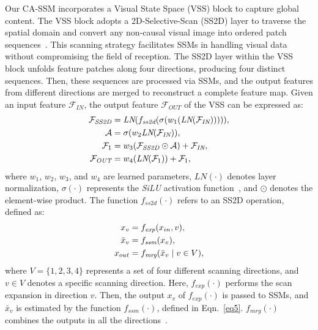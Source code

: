 Our CA-SSM incorporates a Visual State Space (VSS) block to capture global content.
The VSS block adopts a 2D-Selective-Scan (SS2D) layer to traverse the spatial domain and convert any non-causal visual image into ordered patch sequences~\cite{liu2024vmamba}.
This scanning strategy facilitates SSMs in handling visual data without compromising the field of reception.
The SS2D layer within the VSS block unfolds feature patches along four directions, producing four distinct sequences. 
Then, these sequences are processed via SSMs, and the output features from different directions are merged to reconstruct a complete feature map.
Given an input feature $\mathcal{F}_\textit{IN}$, the output feature $\mathcal{F}_\textit{OUT}$ of the VSS can be expressed as:
\vspace{-0.5em}
\begin{equation}
\vspace{-0.5em}
\begin{aligned}
\mathcal{F}_\textit{SS2D} &= \textit{LN}(f_\textit{ss2d}(\sigma (w_1(\textit{LN}(\mathcal{F}_\textit{IN}))))), \\
\mathcal{A} &= \sigma (w_2 \textit{LN}(\mathcal{F}_\textit{IN})), \\
\mathcal{F}_{1} &= w_3( \mathcal{F}_\textit{SS2D} \odot \mathcal{A}) + \mathcal{F}_\textit{IN}, \\
\mathcal{F}_\textit{OUT} &= w_4( \textit{LN} (\mathcal{F}_{1}) ) + \mathcal{F}_{1},
\end{aligned}
\label{eq6}
\end{equation}
where $w_1$, $w_2$, $w_3$, and $w_4$ are learned parameters, 
$\textit{LN}(\cdot)$ denotes layer normalization,
$\sigma(\cdot)$ represents the \textit{SiLU} activation function~\cite{ramachandran2017searching}, 
and $\odot$ denotes the element-wise product. 
The function $f_\textit{ss2d}(\cdot)$ refers to an SS2D operation, defined as:
\vspace{-0.5em}
\begin{equation}
\vspace{-0.5em}
\begin{aligned}
x_{v} &= f_\textit{exp}(x_{in}, v), \\
\bar{x}_v &= f_\textit{ssm}(x_{v}), \\
x_{out} &= f_\textit{mrg}(\bar{x}_v \mid v \in V),
\end{aligned}
\label{eq7}
\end{equation}
where $V=\{1, 2, 3, 4\}$ represents a set of four different scanning directions, and $v \in V$ denotes a specific scanning direction.
Here, $f_\textit{exp}(\cdot)$ performs the scan expansion in direction $v$. Then, the output $x_v$ of $f_\textit{exp}(\cdot)$ is passed to SSMs, and $\bar{x}_v$ is estimated by the function $f_\textit{ssm}(\cdot)$, defined in Eqn.~\eqref{eq5}.
$f_\textit{mrg}(\cdot)$ combines the outputs in all the directions~\cite{liu2024vmamba}.


